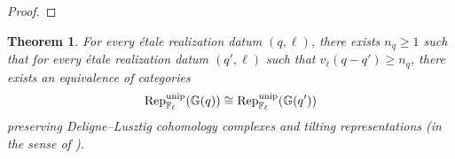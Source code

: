 \documentclass[a4paper, 10pt, oneside, reqno]{amsart}
\theoremstyle{plain}
\newtheorem{thm}{Theorem}[subsection]
\theoremstyle{definition}
\theoremstyle{remark}
\newcommand{\Gbb}{\mathbb{G}}
\begin{document}
\begin{proof}

\end{proof}

\begin{thm}\label{thm:modular-local-constancy-of-category}
For every étale realization datum $(q, \ell)$, there exists $n_q \geq 1$ such that for every étale realization datum $(q', \ell)$ such that $v_{\ell}(q - q') \geq n_q$, there exists an equivalence of categories 
$$\Rep_{\Fl}^{\unip}(\Gbb(q)) \cong \Rep^{\unip}_{\Fl}(\Gbb(q'))$$
preserving Deligne--Lusztig cohomology complexes and tilting representations (in the sense of \cite{EteveTilting}).
\end{thm}
\end{document}
